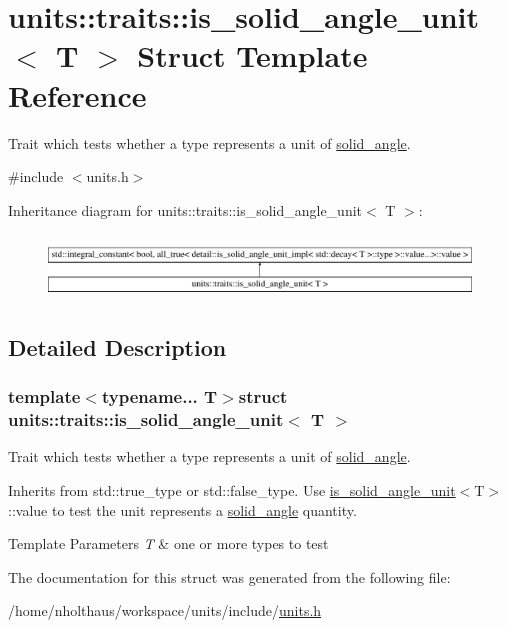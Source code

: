 \hypertarget{structunits_1_1traits_1_1is__solid__angle__unit}{}\section{units\+:\+:traits\+:\+:is\+\_\+solid\+\_\+angle\+\_\+unit$<$ T $>$ Struct Template Reference}
\label{structunits_1_1traits_1_1is__solid__angle__unit}


Trait which tests whether a type represents a unit of \hyperlink{namespaceunits_1_1solid__angle}{solid\+\_\+angle}.  




{\ttfamily \#include $<$units.\+h$>$}

Inheritance diagram for units\+:\+:traits\+:\+:is\+\_\+solid\+\_\+angle\+\_\+unit$<$ T $>$\+:\begin{figure}[H]
\begin{center}
\leavevmode
\includegraphics[height=1.707317cm]{structunits_1_1traits_1_1is__solid__angle__unit}
\end{center}
\end{figure}


\subsection{Detailed Description}
\subsubsection*{template$<$typename... T$>$struct units\+::traits\+::is\+\_\+solid\+\_\+angle\+\_\+unit$<$ T $>$}

Trait which tests whether a type represents a unit of \hyperlink{namespaceunits_1_1solid__angle}{solid\+\_\+angle}. 

Inherits from {\ttfamily std\+::true\+\_\+type} or {\ttfamily std\+::false\+\_\+type}. Use {\ttfamily \hyperlink{structunits_1_1traits_1_1is__solid__angle__unit}{is\+\_\+solid\+\_\+angle\+\_\+unit}$<$T$>$\+::value} to test the unit represents a \hyperlink{namespaceunits_1_1solid__angle}{solid\+\_\+angle} quantity. 
\begin{DoxyTemplParams}{Template Parameters}
{\em T} & one or more types to test \\
\hline
\end{DoxyTemplParams}


The documentation for this struct was generated from the following file\+:\begin{DoxyCompactItemize}
\item 
/home/nholthaus/workspace/units/include/\hyperlink{units_8h}{units.\+h}\end{DoxyCompactItemize}
